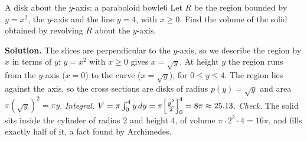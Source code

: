 \documentclass[11pt]{article}
\begin{document}
\begin{exmp}{A disk about the $y$-axis: a paraboloid bowl}{e6}
Let $R$ be the region bounded by $y=x^2$, the $y$-axis and the line $y=4$, with $x\ge0$. Find the volume of the solid obtained by revolving $R$ about the $y$-axis.

\textbf{Solution.} The slices are perpendicular to the $y$-axis, so we describe the region by $x$ in terms of $y$: $y=x^2$ with $x\ge0$ gives $x=\sqrt y$. At height $y$ the region runs from the $y$-axis ($x=0$) to the curve ($x=\sqrt y$), for $0\le y\le4$. The region lies against the axis, so the cross sections are disks of radius $p(y)=\sqrt y$ and area $\pi\left(\sqrt y\right)^2=\pi y$.
\emph{Integral.} $V=\pi\int_0^4y\,dy=\pi\Bigl[\frac{y^2}2\Bigr]_0^4=8\pi\approx25.13$.
\emph{Check.} The solid sits inside the cylinder of radius $2$ and height $4$, of volume $\pi\cdot2^2\cdot4=16\pi$, and fills exactly half of it, a fact found by Archimedes.
\end{exmp}
\end{document}
